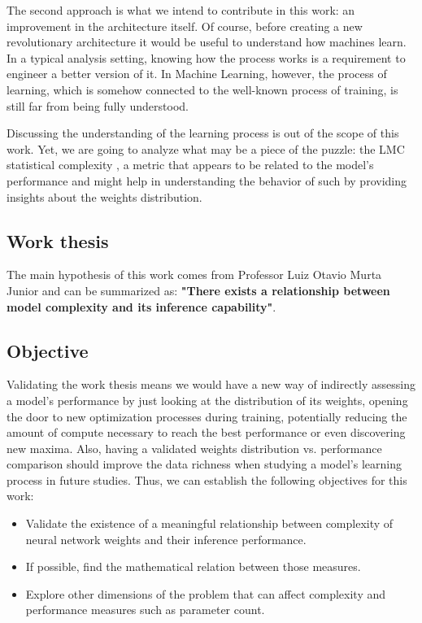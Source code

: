 The second approach is what we intend to contribute in this work: an improvement in the architecture itself. Of course, before creating a new revolutionary architecture it would be useful to understand how machines learn. In a typical analysis setting, knowing how the process works is a requirement to engineer a better version of it. In Machine Learning, however, the process of learning, which is somehow connected to the well-known process of training, is still far from being fully understood.

Discussing the understanding of the learning process is out of the scope of this work. Yet, we are going to analyze what may be a piece of the puzzle: the LMC statistical complexity \cite{LopezRuiz1995}, a metric that appears to be related to the model's performance and might help in understanding the behavior of such by providing insights about the weights distribution.

\subsection{Work thesis}

    The main hypothesis of this work comes from Professor Luiz Otavio Murta Junior \cite{MurtaJunior2025} and can be summarized as: \textbf{"There exists a relationship between model complexity and its inference capability"}.

\subsection{Objective}

    Validating the work thesis means we would have a new way of indirectly assessing a model's performance by just looking at the distribution of its weights, opening the door to new optimization processes during training, potentially reducing the amount of compute necessary to reach the best performance or even discovering new maxima. Also, having a validated weights distribution vs. performance comparison should improve the data richness when studying a model's learning process in future studies. Thus, we can establish the following objectives for this work:
    \begin{itemize}
        \item Validate the existence of a meaningful relationship between complexity of neural network weights and their inference performance.
        \item If possible, find the mathematical relation between those measures.
        \item Explore other dimensions of the problem that can affect complexity and performance measures such as parameter count.
    \end{itemize}
